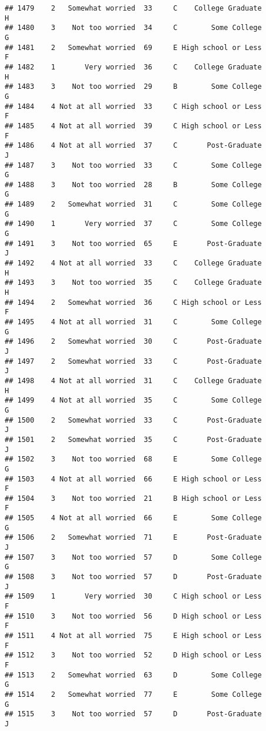 \documentclass[
]{article}
\begin{document}
\begin{verbatim}
## 1479    2   Somewhat worried  33     C    College Graduate         H
## 1480    3    Not too worried  34     C        Some College         G
## 1481    2   Somewhat worried  69     E High school or Less         F
## 1482    1       Very worried  36     C    College Graduate         H
## 1483    3    Not too worried  29     B        Some College         G
## 1484    4 Not at all worried  33     C High school or Less         F
## 1485    4 Not at all worried  39     C High school or Less         F
## 1486    4 Not at all worried  37     C       Post-Graduate         J
## 1487    3    Not too worried  33     C        Some College         G
## 1488    3    Not too worried  28     B        Some College         G
## 1489    2   Somewhat worried  31     C        Some College         G
## 1490    1       Very worried  37     C        Some College         G
## 1491    3    Not too worried  65     E       Post-Graduate         J
## 1492    4 Not at all worried  33     C    College Graduate         H
## 1493    3    Not too worried  35     C    College Graduate         H
## 1494    2   Somewhat worried  36     C High school or Less         F
## 1495    4 Not at all worried  31     C        Some College         G
## 1496    2   Somewhat worried  30     C       Post-Graduate         J
## 1497    2   Somewhat worried  33     C       Post-Graduate         J
## 1498    4 Not at all worried  31     C    College Graduate         H
## 1499    4 Not at all worried  35     C        Some College         G
## 1500    2   Somewhat worried  33     C       Post-Graduate         J
## 1501    2   Somewhat worried  35     C       Post-Graduate         J
## 1502    3    Not too worried  68     E        Some College         G
## 1503    4 Not at all worried  66     E High school or Less         F
## 1504    3    Not too worried  21     B High school or Less         F
## 1505    4 Not at all worried  66     E        Some College         G
## 1506    2   Somewhat worried  71     E       Post-Graduate         J
## 1507    3    Not too worried  57     D        Some College         G
## 1508    3    Not too worried  57     D       Post-Graduate         J
## 1509    1       Very worried  30     C High school or Less         F
## 1510    3    Not too worried  56     D High school or Less         F
## 1511    4 Not at all worried  75     E High school or Less         F
## 1512    3    Not too worried  52     D High school or Less         F
## 1513    2   Somewhat worried  63     D        Some College         G
## 1514    2   Somewhat worried  77     E        Some College         G
## 1515    3    Not too worried  57     D       Post-Graduate         J

\end{verbatim}
\end{document}
